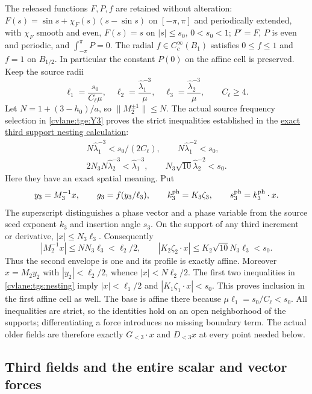 The released functions $F,P,f$ are retained without alteration:
$F(s)=\sin s+\chi_F(s)(s-\sin s)$ on $[-\pi,\pi]$ and
periodically extended, with $\chi_F$ smooth and even,
$F(s)=s$ on $|s|\leq s_0$, $0<s_0<1$;
$P'=F$, $P$ is even and periodic, and
$\int_{-\pi}^{\pi}P=0$.
The radial $f\in C_c^\infty(B_1)$ satisfies $0\leq f\leq1$
and $f=1$ on $B_{1/2}$. In particular the constant $P(0)$
on the affine cell is preserved. Keep the source radii
\begin{equation}\label{cvlane:tgs:radii}
 \ell_1=\frac{s_0}{C_\ell\mu},\quad
 \ell_2=\frac{\widehat\lambda_1^{-3}}\mu,\quad
 \ell_3=\frac{\widehat\lambda_2^{-3}}\mu,\qquad C_\ell\geq4.
\end{equation}
Let $N=1+(3-h_0)/a$, so $\|M_2^{\pm1}\|\leq N$.
The actual source frequency selection in \eqref{cvlane:tge:Y3} proves
the strict inequalities established in the
\hyperref[cvlane:tge:nesting]{exact third support nesting calculation}:
\begin{equation}\label{cvlane:tgs:nesting}
 \begin{gathered}
 N\widehat\lambda_1^{-3}<s_0/(2C_\ell),\qquad
 N\widehat\lambda_1^{-2}<s_0,\\
 2N_3N\widehat\lambda_2^{-3}<\widehat\lambda_1^{-3},
 \qquad N_3\sqrt{10}\widehat\lambda_2^{-2}<s_0.
 \end{gathered}
\end{equation}
Here they have an exact spatial meaning. Put
\[
 y_3=M_3^{-1}x,\qquad g_3=f(y_3/\ell_3),\qquad
 k_3^{\rm ph}=K_3\zeta_3,\qquad s_3^{\rm ph}=k_3^{\rm ph}\cdot x.
\]
The superscript distinguishes a phase vector and a phase variable
from the source seed exponent $k_3$ and insertion angle $s_3$.
On the support of any third increment or derivative,
$|x|\leq N_3\ell_3$. Consequently
\[
 |M_2^{-1}x|\leq NN_3\ell_3<\ell_2/2,\qquad
 |K_2\zeta_2\cdot x|\leq K_2\sqrt{10}N_3\ell_3<s_0.
\]
Thus the second envelope is one and its profile is exactly affine.
Moreover $x=M_2y_2$ with $|y_2|<\ell_2/2$, whence
$|x|<N\ell_2/2$. The first two inequalities in
\eqref{cvlane:tgs:nesting} imply $|x|<\ell_1/2$ and
$|K_1\zeta_1\cdot x|<s_0$.
This proves inclusion in the first affine cell as well.
The base is affine there because $\mu\ell_1=s_0/C_\ell<s_0$.
All inequalities are strict, so the identities hold on an open
neighborhood of the supports; differentiating a force introduces
no missing boundary term. The actual older fields are therefore
exactly $G_{<3}\cdot x$ and $D_{<3}x$ at every point needed below.

\subsection{Third fields and the entire scalar and vector forces}

